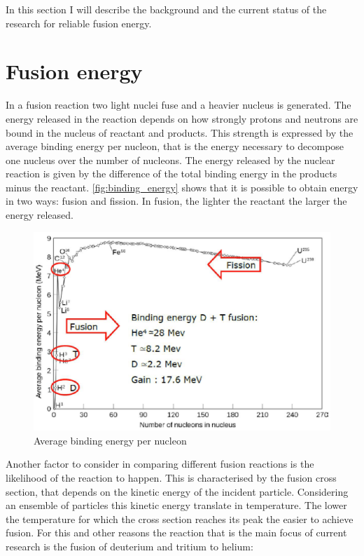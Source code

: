 In this section I will describe the background and the current status of the research for reliable fusion energy.
\section{Fusion energy} \label{Fusion_energy}

In a fusion reaction two light nuclei fuse and a heavier nucleus is generated. The energy released in the reaction depends on how strongly protons and neutrons are bound in the nucleus of reactant and products. This strength is expressed by the average binding energy per nucleon, that is the energy necessary to decompose one nucleus over the number of nucleons. The energy released by the nuclear reaction is given by the difference of the total binding energy in the products minus the reactant. \autoref{fig:binding_energy} shows that it is possible to obtain energy in two ways: fusion and fission. In fusion, the lighter the reactant the larger the energy released.

\begin{figure}
	\centering
	\includegraphics[width=\linewidth]{Chapters/chapter1/figs/binding energy.PNG}
	\caption{Average binding energy per nucleon \cite{YanNingNaulinVolkerWanBaonianXu2014}}
	\label{fig:binding_energy}
\end{figure}

Another factor to consider in comparing different fusion reactions is the likelihood of the reaction to happen. This is characterised by the fusion cross section, that depends on the kinetic energy of the incident particle. Considering an ensemble of particles this kinetic energy translate in temperature. The lower the temperature for which the cross section reaches its peak the easier to achieve fusion.
For this and other reasons the reaction that is the main focus of current research is the fusion of deuterium and tritium to helium: \cite{Miley1974}

